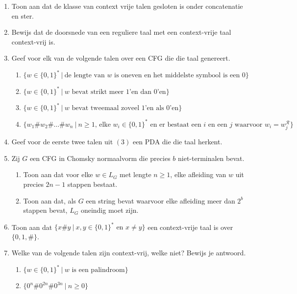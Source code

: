\documentclass[a4paper]{article}
\begin{document}
\begin{enumerate}
   \item Toon aan dat de klasse van context vrije talen gesloten is onder concatenatie en ster.
	\item Bewijs dat de doorsnede van een reguliere taal met een context-vrije taal context-vrij is.
   \item Geef voor elk van de volgende talen over een CFG die die taal genereert.
         \begin{enumerate}
            \item $\{ w \in \{0,1\}^* \ | \ \text{de lengte van $w$ is oneven en het middelste symbool is een $0$} \}$
            \item $\{ w \in \{0,1\}^* \ | \ \text{$w$ bevat strikt meer $1$'en dan $0$'en} \}$
            \item $\{ w \in \{0,1\}^* \ | \ \text{$w$ bevat tweemaal zoveel $1$'en als $0$'en} \}$
            \item $\{ w_1 \# w_2 \# \ldots \# w_n \ | \ \text{$n \geq 1$, elke $w_i \in \{0,1\}^*$ en er bestaat een $i$ en een $j$ waarvoor $w_i = w_j^\mathcal{R}$} \}$
         \end{enumerate}
   \item Geef voor de eerste twee talen uit $(3)$ een PDA die die taal herkent.
   \item Zij $G$ een CFG in Chomsky normaalvorm die precies $b$ niet-terminalen bevat.
         \begin{enumerate}
            \item Toon aan dat voor elke $w \in L_G$ met lengte $n \geq 1$, elke afleiding van $w$ uit precies $2n - 1$ stappen bestaat.
            \item Toon aan dat, als $G$ een string bevat waarvoor elke afleiding meer dan $2^b$ stappen bevat, $L_G$ oneindig moet zijn.
         \end{enumerate}
   \item Toon aan dat $\{ x \# y \ | \ \text{$x,y \in \{0,1\}^*$ en $x \neq y$} \}$ een context-vrije taal is over $\{
0,1,\# \}$.
   \item Welke van de volgende talen zijn context-vrij, welke niet? Bewijs je antwoord.
      \begin{enumerate}
			\item $\{ w \in \{0,1\}^* \ | \ \text{$w$ is een palindroom}\}$
         \item $\{ 0^n\#0^{2n}\#0^{3n} \ | \ n \geq 0 \}$

\end{enumerate}
\end{enumerate}
\end{document}

